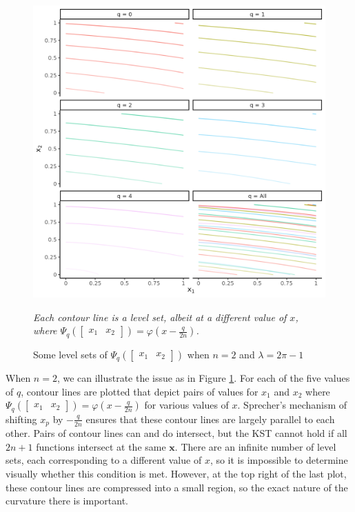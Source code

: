 \begin{figure}
    \begin{center}
    \caption{Some level sets of $\Psi_q\left(\begin{bmatrix} x_1 & x_2\end{bmatrix}\right)$ when $n = 2$ and $\lambda = 2\pi - 1$}
    \label{fig:injective}
    \includegraphics[width=0.95\linewidth]{../images/injective.png}
    \end{center}
    \emph{Each contour line is a level set, albeit at a different value of $x$, where $\Psi_q\left(\begin{bmatrix} x_1 & x_2 \end{bmatrix}\right) = \varphi\left(x - \frac{q}{2n}\right)$.}
\end{figure}

When $n = 2$, we can illustrate the issue as in Figure \ref{fig:injective}. For each of the five values of $q$, contour lines are plotted that depict pairs of values for $x_1$ and $x_2$ where $\Psi_q\left(\begin{bmatrix} x_1 & x_2 \end{bmatrix}\right) = \varphi\left(x - \frac{q}{2n}\right)$ for various values of $x$. Sprecher's mechanism of shifting $x_p$ by $-\frac{q}{2n}$ ensures that these contour lines are largely parallel to each other. Pairs of contour lines can and do intersect, but the KST cannot hold if all $2n + 1$ functions intersect at the same $\mathbf{x}$. There are an infinite number of level sets, each corresponding to a different value of $x$, so it is impossible to determine visually whether this condition is met. However, at the top right of the last plot, these contour lines are compressed into a small region, so the exact nature of the curvature there is important.

